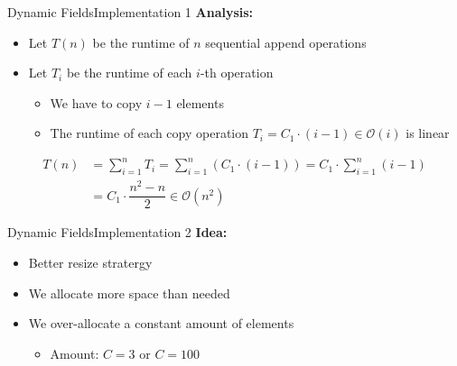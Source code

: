 
\begin{frame}{Dynamic Fields}{Implementation 1}
  \textbf{Analysis:}
  \begin{itemize}
    \item
      Let $T(n)$ be the runtime of $n$ sequential append operations
    \item
      Let $T_i$ be the runtime of each $i$-th operation
      \begin{itemize}
        \item
          We have to copy $i-1$ elements
        \item
          The runtime of each copy operation
          $T_i = C_1 \cdot (i - 1) \in \mathcal{O}(i)$ is linear
      \end{itemize}
  \end{itemize}
  \begin{align*}
    T(n) &= \sum_{i=1}^n T_i
      = \sum_{i=1}^n \left(C_1 \cdot (i-1) \right)
      = C_1 \cdot \sum_{i=1}^n (i-1)\\
      &= C_1 \cdot \dfrac{n^2-n}{2} \in \mathcal{O}(n^2)
  \end{align*}
\end{frame}


\begin{frame}{Dynamic Fields}{Implementation 2}
  \textbf{Idea:}
  \begin{itemize}
    \item
      Better resize stratergy
    \item
      We allocate more space than needed
    \item
      We over-allocate a constant amount of elements
      \begin{itemize}
        \item
          Amount: $C = 3$ or $C = 100$
      \end{itemize}
  \end{itemize}
\end{frame}



